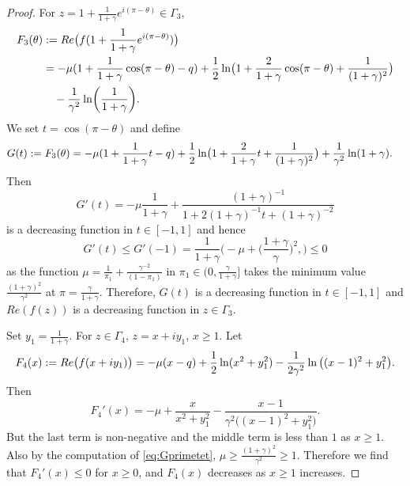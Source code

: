 \documentclass[11pt]{article}
\begin{document}
\begin{proof}
For $z=1+\frac1{1+\gamma}e^{i(\pi-\theta)}\in\Gamma_3$,
\begin{equation}
\begin{split}
  F_3(\theta) &:= Re\bigl(f(1+\frac1{1+\gamma}e^{i(\pi-\theta)})
  \bigr) \\
  &= -\mu(1+\frac1{1+\gamma}\cos(\pi-\theta) -q) + \frac12 \ln\bigl( 1+\frac2{1+\gamma} \cos(\pi-\theta)
  + \frac{1}{(1+\gamma)^2} \bigr) \\
  &\quad -\frac1{\gamma^2} \ln \biggl( \frac1{1+\gamma} \biggr).
\end{split}
\end{equation}
We set $t=\cos(\pi-\theta)$ and define
\begin{equation}
\begin{split}
  G(t)&:= F_3(\theta) =
  -\mu(1+\frac1{1+\gamma}t -q) + \frac12 \ln\bigl( 1+\frac2{1+\gamma} t
  + \frac{1}{(1+\gamma)^2} \bigr) +\frac1{\gamma^2} \ln(1+\gamma).
\end{split}
\end{equation}
Then
\begin{equation}
  G'(t) = -\mu\frac{1}{1+\gamma} + \frac{(1+\gamma)^{-1}}{1+2(1+\gamma)^{-1}t+(1+\gamma)^{-2}}
\end{equation}
is a decreasing function in $t\in[-1,1]$ and hence
\begin{equation}\label{eq:Gprimetet}
  G'(t)\le G'(-1)=\frac1{1+\gamma}\biggl( -\mu+\bigl(
  \frac{1+\gamma}{\gamma}\bigr)^2,
\biggr)\le 0
\end{equation}
as the function $\mu= \frac1{\pi_1}+\frac{\gamma^{-2}}{(1-\pi_1)}$
in $\pi_1\in (0, \frac{\gamma}{1+\gamma}]$ takes the minimum value
$\frac{(1+\gamma)^2}{\gamma^2}$ at $\pi=\frac{\gamma}{1+\gamma}$.
Therefore, $G(t)$ is a decreasing function in $t\in[-1,1]$ and
$Re(f(z))$ is a decreasing function in $z\in\Gamma_3$.

Set $y_1=\frac1{1+\gamma}$. For $z\in \Gamma_4$, $z=x+iy_1$, $x\ge
1$. Let
\begin{equation}
\begin{split}
  F_4(x) := Re \bigl( f(x+iy_1) \bigr)= -\mu (x-q) + \frac12 \ln (x^2+y_1^2) - \frac1{2\gamma^2} \ln
  \big( (x-1)^2+y_1^2 \bigr).
\end{split}
\end{equation}
Then
\begin{equation}
  F_4'(x) = -\mu + \frac{x}{x^2+y_1^2} - \frac{x-1}{\gamma^2\bigl( (x-1)^2+y_1^2
  \bigr)}.
\end{equation}
But the last term is non-negative and the middle term is less than
$1$ as $x\ge 1$. Also by the computation of \eqref{eq:Gprimetet},
$\mu \ge \frac{(1+\gamma)^2}{\gamma^2} \ge 1$. Therefore we find
that $F_4'(x) \le 0$ for $x\ge 0$, and $F_4(x)$ decreases as $x\ge
1$ increases.


\end{proof}
\end{document}
